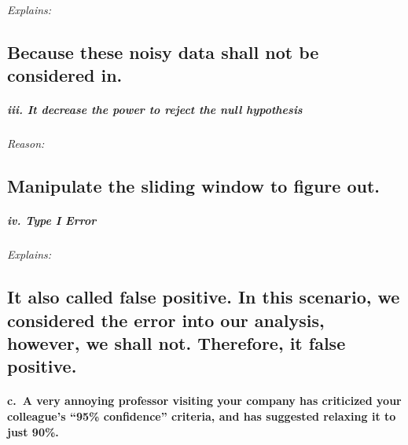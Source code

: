 \documentclass[
]{article}
\begin{document}
\emph{Explains:}

\hypertarget{because-these-noisy-data-shall-not-be-considered-in.}{%
\subsection{Because these noisy data shall not be considered
in.}\label{because-these-noisy-data-shall-not-be-considered-in.}}

\hypertarget{iii.-it-decrease-the-power-to-reject-the-null-hypothesis}{%
\subparagraph{\texorpdfstring{iii. \emph{It decrease the power to reject
the null
hypothesis}}{iii. It decrease the power to reject the null hypothesis}}\label{iii.-it-decrease-the-power-to-reject-the-null-hypothesis}}

\emph{Reason:}

\hypertarget{manipulate-the-sliding-window-to-figure-out.}{%
\subsection{Manipulate the sliding window to figure
out.}\label{manipulate-the-sliding-window-to-figure-out.}}

\hypertarget{iv.-type-i-error}{%
\subparagraph{\texorpdfstring{iv. \emph{Type I
Error}}{iv. Type I Error}}\label{iv.-type-i-error}}

\emph{Explains:}

\hypertarget{it-also-called-false-positive.-in-this-scenario-we-considered-the-error-into-our-analysis-however-we-shall-not.-therefore-it-false-positive.}{%
\subsection{It also called false positive. In this scenario, we
considered the error into our analysis, however, we shall not.
Therefore, it false
positive.}\label{it-also-called-false-positive.-in-this-scenario-we-considered-the-error-into-our-analysis-however-we-shall-not.-therefore-it-false-positive.}}

\hypertarget{c.-a-very-annoying-professor-visiting-your-company-has-criticized-your-colleagues-95-confidence-criteria-and-has-suggested-relaxing-it-to-just-90.}{%
\paragraph{c.~A very annoying professor visiting your company has
criticized your colleague's ``95\% confidence'' criteria, and has
suggested relaxing it to just
90\%.}\label{c.-a-very-annoying-professor-visiting-your-company-has-criticized-your-colleagues-95-confidence-criteria-and-has-suggested-relaxing-it-to-just-90.}}
\end{document}
